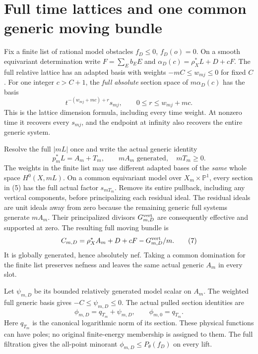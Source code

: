 \documentclass[11pt]{article}
\begin{document}
\section{Full time lattices and one common generic moving bundle}
Fix a finite list of rational model obstacles $f_D\leq0$,
$f_D(o)=0$. On a smooth equivariant determination write
$F=\sum_E b_EE$ and $\alpha_D(c)=\rho_X^*L+D+cF$.
The full relative lattice has an adapted basis with weights
$-mC\leq w_{mj}\leq0$ for fixed $C$.
For one integer $c>C+1$, the \emph{full absolute} section space
of $m\alpha_D(c)$ has the basis
\[
 t^{-(w_{mj}+mc)+r}s_{mj},\qquad 0\leq r\leq w_{mj}+mc.
                                                        \tag{5}
\]
This is the lattice dimension formula, including every time weight.
At nonzero time it recovers every $s_{mj}$, and the endpoint at
infinity also recovers the entire generic system.

Resolve the full $|mL|$ once and write the actual generic identity
\[
 p_m^*L=A_m+T_m,\qquad mA_m\text{ generated},\quad mT_m\geq0.
                                                        \tag{6}
\]
The weights in the finite list may use different adapted bases of
the \emph{same} whole space $H^0(X,mL)$.
On a common equivariant model over $X_m\times\mathbb P^1$,
every section in (5) has the full actual factor $s_{mT_m}$.
Remove its entire pullback, including any vertical components,
before principalizing each residual ideal.
The residual ideals are unit ideals away from zero because the
remaining generic full systems generate $mA_m$.
Their principalized divisors $G^{\rm vert}_{m,D}$ are consequently
effective and supported at zero.
The resulting full moving bundle is
\[
 C_{m,D}=\rho_X^*A_m+D+cF-G^{\rm vert}_{m,D}/m.          \tag{7}
\]
It is globally generated, hence absolutely nef.
Taking a common domination for the finite list preserves nefness
and leaves the same actual generic $A_m$ in every slot.

Let $\psi_{m,D}$ be its bounded relatively generated model scalar
on $A_m$. The weighted full generic basis gives $-C\leq\psi_{m,D}\leq0$.
The actual pulled section identities are
\[
 \phi_{m,D}=q_{T_m}+\psi_{m,D},\qquad \phi_{m,0}=q_{T_m}.
                                                        \tag{8}
\]
Here $q_{T_m}$ is the canonical logarithmic norm of its section.
These physical functions can have poles; no original finite-energy
membership is assigned to them.
The full filtration gives the all-point minorant
$\phi_{m,D}\leq P_\theta(f_D)$ on every lift.
\end{document}
